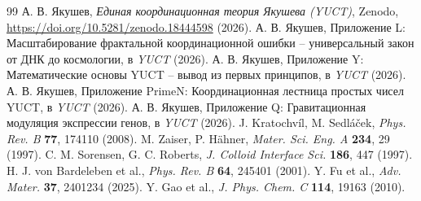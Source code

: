 \documentclass[12pt,a4paper]{article}
\begin{document}
	\begin{thebibliography}{99}
		А. В. Якушев, \emph{Единая координационная теория Якушева (YUCT)}, Zenodo, \url{https://doi.org/10.5281/zenodo.18444598} (2026).
		А. В. Якушев, Приложение L: Масштабирование фрактальной координационной ошибки -- универсальный закон от ДНК до космологии, в \emph{YUCT} (2026).
		А. В. Якушев, Приложение Y: Математические основы YUCT -- вывод из первых принципов, в \emph{YUCT} (2026).
		А. В. Якушев, Приложение PrimeN: Координационная лестница простых чисел YUCT, в \emph{YUCT} (2026).
		А. В. Якушев, Приложение Q: Гравитационная модуляция экспрессии генов, в \emph{YUCT} (2026).
		J. Kratochv\'il, M. Sedl\'a\v{c}ek, \emph{Phys. Rev. B} \textbf{77}, 174110 (2008).
		M. Zaiser, P. H\"ahner, \emph{Mater. Sci. Eng. A} \textbf{234}, 29 (1997).
		C. M. Sorensen, G. C. Roberts, \emph{J. Colloid Interface Sci.} \textbf{186}, 447 (1997).
		H. J. von Bardeleben et al., \emph{Phys. Rev. B} \textbf{64}, 245401 (2001).
		Y. Fu et al., \emph{Adv. Mater.} \textbf{37}, 2401234 (2025).
		Y. Gao et al., \emph{J. Phys. Chem. C} \textbf{114}, 19163 (2010).
	\end{thebibliography}
	
\end{document}
